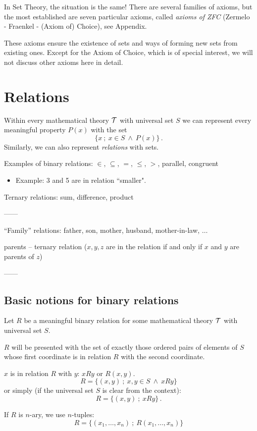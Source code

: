 \documentclass[11pt,paper=b5,footinclude,headinclude]{scrbook} %
\def\inn {{~\wedge~}}
\theoremstyle{remark}
\theoremstyle{definition} %
\theoremstyle{theorem} %
\begin{document}
In Set Theory, the situation is the same! There are several families of axioms, but the most established are seven particular axioms, called {\em axioms of ZFC} (Zermelo - Fraenkel - (Axiom of) Choice), see Appendix.

These axioms ensure the existence of sets and ways of forming new sets from existing ones. 
Except for the Axiom of Choice, which is of special interest, we will not discuss other axioms here in detail.

\chapter{Relations}

Within every mathematical theory ${\cal T}$ with universal set $S$
we can represent every meaningful property $P(x)$
with the set $$\{x~;~x\in S\inn P(x)\}\,.$$
Similarly, we can also represent {\em relations} with sets.

\medskip
Examples of binary relations: $\in$, $\subseteq$, $=$, $\le$, $>$, parallel, congruent
\begin{itemize}
          \item Example: 3 and 5 are in relation ``smaller".
\end{itemize}
Ternary relations: sum, difference, product

------

``Family'' relations: father, son, mother, husband, mother-in-law, $\ldots$

parents -- ternary relation ($x,y,z$ are in the relation if and only if $x$ and $y$ are parents of $z$)

------
\section{Basic notions for binary relations}

Let $R$ be a meaningful binary relation for some mathematical theory ${\cal T}$ with universal set $S$.

$R$ will be presented with the set of exactly those ordered pairs of elements of $S$
whose first coordinate is in relation $R$ with the second coordinate.

$x$ is in relation $R$ with  $y$: $xRy$ or $R(x,y)$.
$$R = \{(x,y)~;~x,y\in S\inn xRy\}$$
or simply (if the universal set $S$ is clear from the context):
$$R = \{(x,y)~;~xRy\}\,.$$

\medskip
If $R$ is $n$-ary, we use $n$-tuples:
$$R = \{(x_1,\ldots, x_n)~;~R(x_1,\ldots, x_n)\}$$
\end{document}
